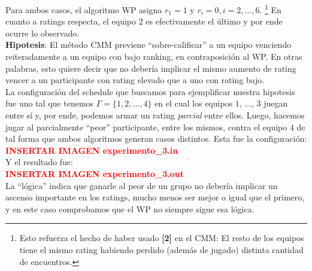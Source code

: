 Para ambos casos, el algoritmo WP asigna $r_1 = 1$ y $r_i = 0, i = 2, ..., 6$. \footnote{Esto refuerza el hecho de haber usado \textbf{[2]} en el CMM: El resto de los equipos tiene el mismo rating habiendo perdido (además de jugado) distinta cantidad de encuentros.} En cuanto a ratings respecta, el equipo $2$ es efectivamente el \'ultimo y por ende ocurre lo observado. \\

\textbf{Hipotesis}: El m\'etodo CMM previene ``sobre-calificar'' a un equipo venciendo reiteradamente a un equipo con bajo ranking, en contraposici\'on al WP. En otras palabras, esto quiere decir que no deber\'ia implicar el mismo aumento de rating vencer a un participante con rating elevado que a uno con rating bajo. \\

La configuraci\'on del schedule que buscamos para ejemplificar nuestra hipotesis fue uno tal que tenemos $\Gamma = \{1,2,...,4\}$ en el cual los equipos $1$, ..., $3$ juegan entre s\'i y, por ende, podemos armar un rating \textit{parcial} entre ellos. Luego, hacemos jugar al parcialmente ``peor'' participante, entre los mismos, contra el equipo $4$ de tal forma que ambos algoritmos generan casos distintos. Esta fue la configuraci\'on: \\

\textcolor{red}{\textbf{INSERTAR IMAGEN experimento_3.in}} \\

Y el resultado fue: \\

\textcolor{red}{\textbf{INSERTAR IMAGEN experimento_3.out}} \\

La ``l\'ogica'' indica que ganarle al peor de un grupo no deber\'ia implicar un ascenso importante en los ratings, mucho menos ser mejor o igual que el primero, y en este caso comprobamos que el WP no siempre sigue esa l\'ogica.
